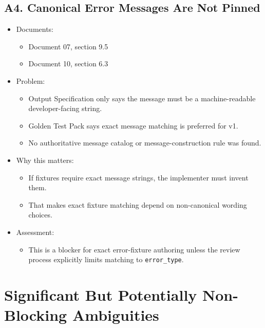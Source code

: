 \documentclass[11pt]{article}
\begin{document}
\subsection{A4. Canonical Error Messages Are Not Pinned}
\label{sec:org3ada4c6}
\begin{itemize}
\item Documents:
\begin{itemize}
\item Document 07, section 9.5
\item Document 10, section 6.3
\end{itemize}
\item Problem:
\begin{itemize}
\item Output Specification only says the message must be a machine-readable developer-facing string.
\item Golden Test Pack says exact message matching is preferred for v1.
\item No authoritative message catalog or message-construction rule was found.
\end{itemize}
\item Why this matters:
\begin{itemize}
\item If fixtures require exact message strings, the implementer must invent them.
\item That makes exact fixture matching depend on non-canonical wording choices.
\end{itemize}
\item Assessment:
\begin{itemize}
\item This is a blocker for exact error-fixture authoring unless the review process explicitly limits matching to \texttt{error\_type}.
\end{itemize}
\end{itemize}
\section{Significant But Potentially Non-Blocking Ambiguities}
\label{sec:org76c0736}
\end{document}

